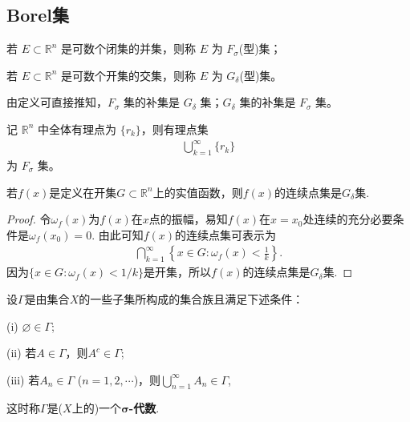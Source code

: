 \documentclass[../../main.tex]{subfiles}
\begin{document}
\subsection{Borel集}

\begin{definition}\label{definition:F_sigma,G_delta集}
若 $E \subset \mathbb{R}^n$ 是可数个闭集的并集，则称 $E$ 为 $F_{\sigma}$(型)集；

若 $E \subset \mathbb{R}^n$ 是可数个开集的交集，则称 $E$ 为 $G_{\delta}$(型)集。
\end{definition}
\begin{remark}
由定义可直接推知，$F_{\sigma}$ 集的补集是 $G_{\delta}$ 集；$G_{\delta}$ 集的补集是 $F_{\sigma}$ 集。
\end{remark}

\begin{example}
记 $\mathbb{R}^n$ 中全体有理点为 $\{r_k\}$，则有理点集
\begin{align*}
\bigcup_{k = 1}^{\infty} \{r_k\}
\end{align*}
为 $F_{\sigma}$ 集。 
\end{example}

\begin{example}[函数连续点的结构]
若$f(x)$是定义在开集$G\subset\mathbb{R}^n$上的实值函数，则$f(x)$的连续点集是$G_{\delta}$集.
\end{example}
\begin{proof}
令$\omega_f(x)$为$f(x)$在$x$点的振幅，易知$f(x)$在$x = x_0$处连续的充分必要条件是$\omega_f(x_0)=0$. 由此可知$f(x)$的连续点集可表示为
\begin{align*}
\bigcap_{k = 1}^{\infty}\left\{x\in G:\omega_f(x)<\frac{1}{k}\right\}.
\end{align*}
因为$\{x\in G:\omega_f(x)<1/k\}$是开集，所以$f(x)$的连续点集是$G_{\delta}$集. 
\end{proof}

\begin{definition}[$\sigma$-代数]
设$\Gamma$是由集合$X$的一些子集所构成的集合族且满足下述条件：

(i) $\varnothing\in\Gamma$;

(ii) 若$A\in\Gamma$，则$A^c\in\Gamma$;

(iii) 若$A_n\in\Gamma$ ($n = 1,2,\cdots$)，则$\bigcup_{n = 1}^{\infty}A_n\in\Gamma$,

这时称$\Gamma$是($X$上的)一个\textbf{$\boldsymbol{\sigma}$-代数}.
\end{definition}
\end{document}
